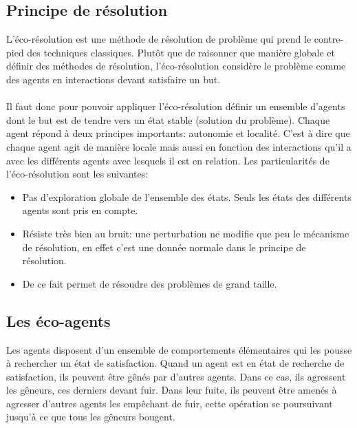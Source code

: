         \subsection{Principe de résolution}
            L'éco-résolution est une méthode de résolution de problème qui prend le contre-pied des techniques classiques. Plutôt que de raisonner que manière globale et définir des méthodes de résolution, l'éco-résolution considère le problème comme des agents en interactions devant satisfaire un but. \\ \\
            Il faut donc pour pouvoir appliquer l'éco-résolution définir un ensemble d'agents dont le but est de tendre vers un état stable (solution du problème). Chaque agent répond à deux principes importants: autonomie et localité. C'est à dire que chaque agent agit de manière locale mais aussi en fonction des interactions qu'il a avec les différents agents avec lesquels il est en relation.
            Les particularités de l'éco-résolution sont les suivantes:
            \begin{itemize}
            \item Pas d'exploration globale de l'ensemble des états. Seuls les états des différents agents sont pris en compte. 
            \item Résiste très bien au bruit: une perturbation ne modifie que peu le mécanisme de résolution, en effet c'est une donnée normale dans le principe de résolution.
            \item De ce fait permet de résoudre des problèmes de grand taille. 
            \end{itemize}

        \subsection{Les éco-agents}
            Les agents disposent d'un ensemble de comportements élémentaires qui les pousse à rechercher un état de satisfaction. Quand un agent est en état de recherche de satisfaction, ils peuvent être gênés par d'autres agents. Dans ce cas, ils agressent les gêneurs, ces derniers devant fuir.  Dans leur fuite, ils peuvent être amenés à agresser d'autres agents les empêchant de fuir, cette opération se poursuivant jusqu'à ce que tous les gêneurs bougent. \\


